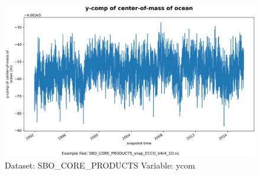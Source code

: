 \begin{figure}[H]
\centering
\includegraphics[scale=0.55]{../images/plots/oneD_plots/SBO_Core_Products/ycom.png}
\caption{Dataset: SBO\_CORE\_PRODUCTS Variable: ycom}
\label{tab:table-SBO_CORE_PRODUCTS_ycom-Plot}
\end{figure}
\pagebreak
